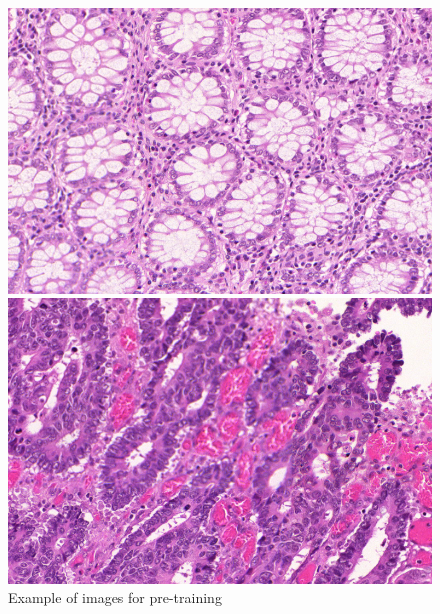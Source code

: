 \begin{figure}[H]
	\centering
	
	\begin{minipage}[b]{0.4\columnwidth}
		\centering
		\includegraphics[clip, width=\linewidth]{fig/chapter2/pretrain_image/testA_5.bmp}
	\end{minipage}
	\hspace{5truemm}	
	\begin{minipage}[b]{0.4\columnwidth}
		\centering
		\includegraphics[clip, width=\linewidth]{fig/chapter2/pretrain_image/testA_12.bmp}
	\end{minipage}
	
	\caption{Example of images for pre-training}
	\label{fig:事前学習画像}
	
\end{figure}

